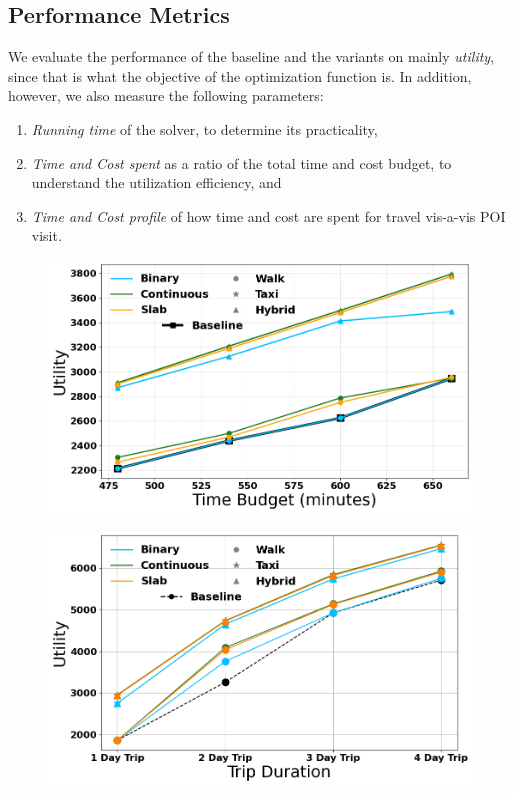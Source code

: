 \subsection{Performance Metrics}

We evaluate the performance of the baseline and the \trip variants on mainly \emph{utility}, since that is what the objective of the optimization function is.
In addition, however, we also measure the following parameters:

\begin{enumerate}
    \item \emph{Running time} of the solver, to determine its practicality,
    \item \emph{Time and Cost spent} as a ratio of the total time and cost budget, to understand the utilization efficiency, and
    \item \emph{Time and Cost profile} of how time and cost are spent for travel vis-a-vis POI visit.
\end{enumerate}

\begin{figure}[t]
\centering
\includegraphics[width=\figwidth]{plots/baseline_singleDay.png}
\label{fig:baseline-single}
\end{figure}

\begin{figure}[t]
\centering
\includegraphics[width=\figwidth]{plots/baseline_multiDay.png}
\label{fig:baseline-multi}
\end{figure}

